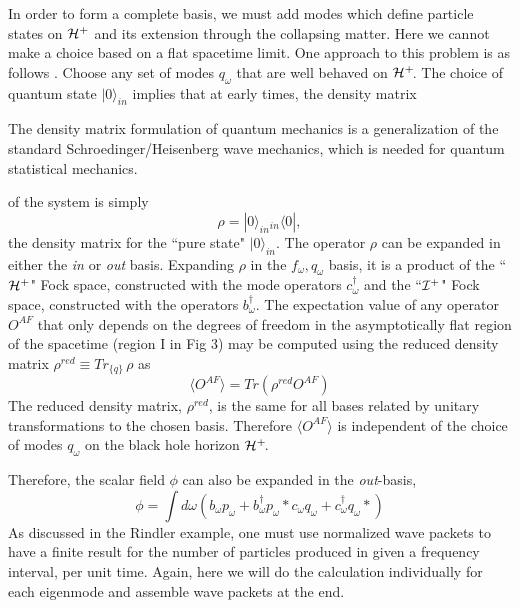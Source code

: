 \documentclass[12pt]{article}
\newcommand{\be}{\begin{equation}}
\newcommand{\ee}{\end{equation}}
\newcommand{\p}{\partial}
\def\fh{{\cal H}^+}
\def\finf{{\cal I}^+}
\def\f{f_{\omega}}
\def\p{p_{\omega}}
\def\q{q_{\omega}}
\def\b{b_{\omega}}
\def\bd{b^{\dagger}_{\omega} }
\def\c{c_{\omega}}
\def\cd{c^{\dagger}_{\omega} }
\def\vac{|0\rangle_{in} }
\begin{document}
In order to form a complete basis, we must add modes which define particle
states on $\fh$
and its extension through the collapsing matter. Here we cannot
make a choice based on a flat spacetime limit. One
approach to this problem is as follows \cite{hawking}.  Choose any set of modes
$\q$ that are well behaved on $\fh\!$. The choice of quantum state $\vac$
implies that at early times, the density matrix\begin{footnote}{The density
matrix
formulation of quantum mechanics is a generalization of the standard
Schroedinger/Heisenberg wave mechanics, which is needed for quantum
statistical mechanics.}\end{footnote}
of the system is simply
%
\be\label{density}\rho =\vac {}_{in} \langle0| ,\ee
%
the density matrix for the ``pure state" $\vac$. The operator
$\rho$ can be expanded in either the {\it in} or {\it out} basis. Expanding
$\rho$ in the
$\f ,\q $ basis, it is a product of the ``$\fh$" Fock space, constructed with
the mode operators $\cd$ and the ``$\finf$" Fock space, constructed with
the operators
$\bd$.
The expectation value of any operator $O^{AF}$ that only depends
on the degrees of freedom in the asymptotically flat region of the
spacetime (region I in Fig 3) may be computed using the reduced density
matrix $\rho ^{red} \equiv Tr_{\{q\}}\,\rho$ as
%
\be\label{reduced}\langle O^{AF} \rangle= Tr (\rho^{red} O^{AF} ) \ee
%
The reduced density matrix,
$\rho ^{red}$, is the same for all bases related by unitary transformations
to the chosen basis. Therefore $\langle O^{AF} \rangle$ is independent of the choice of modes
$\q$ on the black hole horizon $\fh\!$.

Therefore, the scalar field $\phi$ can also be expanded in the {\it out}-basis,
%
\be\label{basfour}\phi = \int d\omega (  \b \p + \b^{\dagger} \p *
\c \q + \cd \q * )\ee
%
As discussed in the Rindler example,  one must use normalized
wave packets to have a finite result for the number of particles
produced in given a frequency interval, per unit time.  Again, here we will
do the calculation individually for each eigenmode and assemble wave
packets at the end.
\end{document}

